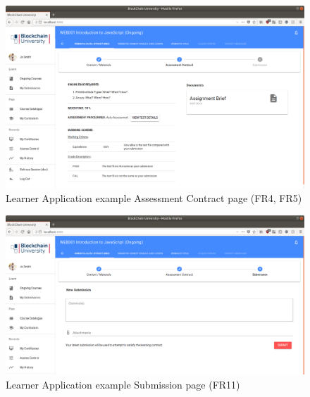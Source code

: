 \begin{figure}[!ht]
	\centering
	\includegraphics[width=1.05\textwidth]{Learner_ongoing2}
	\caption[Learner Application example Assessment Contract page]
	{Learner Application example Assessment Contract page (FR4, FR5)}
	\label{fig:Learner_ongoing2}
\end{figure}

\begin{figure}[!ht]
	\centering
	\includegraphics[width=1.05\textwidth]{Learner_ongoing3}
	\caption[Learner Application example Submission page]
	{Learner Application example Submission page (FR11)}
	\label{fig:Learner_ongoing3}
\end{figure}

